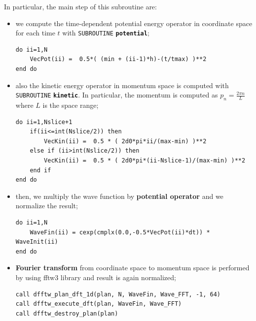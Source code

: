 \documentclass[rmp,10pt,onecolumn,fleqn,notitlepage]{revtex4-1}
\begin{document}
\begin{enumerate}
In particular, the main step of this subroutine are:

\begin{itemize}
\item we compute the time-dependent potential energy operator in coordinate space for each time \( t \) with \texttt{SUBROUTINE} {\bfseries\texttt{potential}};

\begin{minipage}[t]{0.6\linewidth}%
\begin{lstlisting}[style=Fortran]
do ii=1,N
    VecPot(ii) =  0.5*( (min + (ii-1)*h)-(t/tmax) )**2
end do\end{lstlisting}
\end{minipage}

\item also the kinetic energy operator in momentum space is computed with \texttt{SUBROUTINE} {\bfseries\texttt{kinetic}}. In particular, the momentum is computed as \( p_n = \frac{2 \pi n}{L}  \) where \( L \) is the space range;

\begin{minipage}[t]{0.7\linewidth}%
\begin{lstlisting}[style=Fortran]
do ii=1,Nslice+1
    if(ii<=int(Nslice/2)) then
        VecKin(ii) =  0.5 * ( 2d0*pi*ii/(max-min) )**2
    else if (ii>int(Nslice/2)) then
        VecKin(ii) =  0.5 * ( 2d0*pi*(ii-Nslice-1)/(max-min) )**2
    end if
end do\end{lstlisting}
\end{minipage}

\item then, we multiply the wave function by \textbf{potential operator} and we normalize the result;

\begin{minipage}[t]{0.75\linewidth}%
\begin{lstlisting}[style=Fortran]
do ii=1,N
    WaveFin(ii) = cexp(cmplx(0.0,-0.5*VecPot(ii)*dt)) * WaveInit(ii)
end do\end{lstlisting}
\end{minipage}

\item \textbf{Fourier transform} from coordinate space to momentum space is performed by using fftw3 library and result is again normalized;

\begin{minipage}[t]{0.75\linewidth}%
\begin{lstlisting}[style=Fortran]
call dfftw_plan_dft_1d(plan, N, WaveFin, Wave_FFT, -1, 64)
call dfftw_execute_dft(plan, WaveFin, Wave_FFT)
call dfftw_destroy_plan(plan)\end{lstlisting}
\end{minipage}


\end{itemize}
\end{enumerate}
\end{document}
